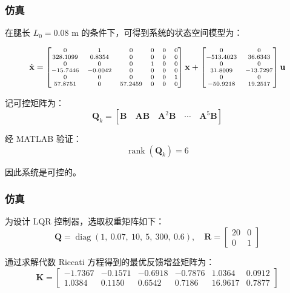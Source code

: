 \documentclass{beamer}
\begin{document}
	\begin{frame}
		\frametitle{仿真}

		在腿长 $L_0 = 0.08$ m 的条件下，可得到系统的状态空间模型为：
		
		\begin{equation*}
			\scriptsize
			\dot{\mathbf{x}} = 
			\begin{bmatrix}
				0 & 1 & 0 & 0 & 0 & 0 \\
				328.1099 & 0.8354 & 0 & 0 & 0 & 0 \\
				0 & 0 & 0 & 1 & 0 & 0 \\
				-15.7446 & -0.0042 & 0 & 0 & 0 & 0 \\
				0 & 0 & 0 & 0 & 0 & 1 \\
				57.8751 & 0 & 57.2459 & 0 & 0 & 0
			\end{bmatrix} \mathbf{x} +
			\begin{bmatrix}
				0 & 0 \\
				-513.4023 & 36.6343 \\
				0 & 0 \\
				31.8009 & -13.7297 \\
				0 & 0 \\
				-50.9218 & 19.2517
			\end{bmatrix} \mathbf{u}
			\normalsize
		\end{equation*}
		
		记可控矩阵为：
		\[
		\mathbf{Q}_k = \left[ \mathbf{B} \quad \mathbf{AB} \quad \mathbf{A}^2\mathbf{B} \quad \cdots \quad \mathbf{A}^5\mathbf{B} \right]
		\]
		
		经 MATLAB 验证：
		\[
		\operatorname{rank}(\mathbf{Q}_k) = 6
		\]
		
		因此系统是可控的。
		
	

	\end{frame}
	

	\begin{frame}
		\frametitle{仿真}
		为设计 LQR 控制器，选取权重矩阵如下：
		\[
		\mathbf{Q} = \operatorname{diag}(1,\ 0.07,\ 10,\ 5,\ 300,\ 0.6), \quad \mathbf{R} = 
		\begin{bmatrix}
			20 & 0 \\
			0 & 1
		\end{bmatrix}
		\]
		
		通过求解代数 Riccati 方程得到的最优反馈增益矩阵为：
		\[
		\mathbf{K} = 
		\begin{bmatrix}
			-1.7367 & -0.1571 & -0.6918 & -0.7876 & 1.0364 & 0.0912 \\
			1.0384 & 0.1150 & 0.6542 & 0.7186 & 16.9617 & 0.7877
		\end{bmatrix}
		\]
		
	\end{frame}
\end{document}
